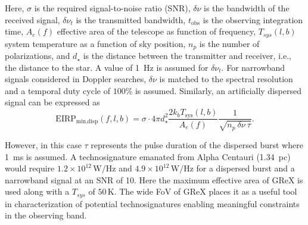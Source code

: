 Here, $\sigma$ is the required signal-to-noise ratio (SNR), $\delta\nu$ is the bandwidth of the received signal, $\delta\nu_t$ is the transmitted bandwidth, $t_{\text{obs}}$ is the observing integration time, $A_e(f)$ effective area of the telescope as function of frequency, $T_{sys}(l,b)$ system temperature as a function of sky position, $n_p$ is the number of polarizations, and $d_\star$ is the distance between the transmitter and receiver, i.e., the distance to the star.
A value of 1~Hz is assumed for $\delta\nu_t$. For narrowband signals considered in Doppler searches, $\delta\nu$ is matched to the spectral resolution and a temporal duty cycle of $100$\% is assumed. Similarly, an artificially dispersed signal can be expressed as
\begin{equation}
    \text{EIRP}_\text{min,disp}(f, l, b) = \sigma \cdot 4\pi d_\star^2  \dfrac{2 k_b T_{\text{sys}}(l, b)}{A_e(f)}  \dfrac{1}{\sqrt{n_p ~\delta \nu ~ \tau}}.
\end{equation}

However, in this case $\tau$ represents the pulse duration of the dispersed burst where 1~ms is assumed.
A technosignature emanated from Alpha Centauri (1.34~pc) would require $1.2\times10^{12}\,\text{W/Hz}$ and $4.9\times10^{12}\,\text{W/Hz}$ for a dispersed burst and a narrowband signal at an SNR of 10.
Here the maximum effective area of GReX is used along with a $T_{sys}$ of $50\,\text{K}$.
The wide FoV of GReX places it as a useful tool in characterization of potential technosignatures enabling meaningful constraints in the observing band.  
